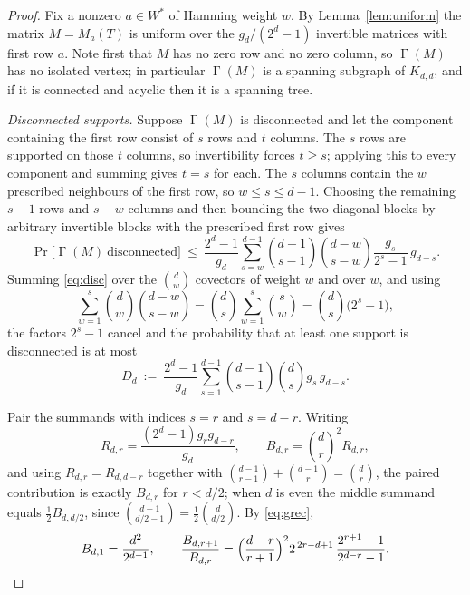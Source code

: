 \documentclass[11pt,reqno]{amsart}
\theoremstyle{plain}
\theoremstyle{definition}
\DeclareMathOperator{\Gam}{\Gamma}
\begin{document}
\begin{proof}
Fix a nonzero $a\in W^{*}$ of Hamming weight $w$. By Lemma~\ref{lem:uniform} the matrix $M=M_{a}(T)$ is uniform over the $g_{d}/(2^{d}-1)$ invertible matrices with first row $a$. Note first that $M$ has no zero row and no zero column, so $\Gam(M)$ has no isolated vertex; in particular $\Gam(M)$ is a spanning subgraph of $K_{d,d}$, and if it is connected and acyclic then it is a spanning tree.

\smallskip
\noindent\emph{Disconnected supports.} Suppose $\Gam(M)$ is disconnected and let the component containing the first row consist of $s$ rows and $t$ columns. The $s$ rows are supported on those $t$ columns, so invertibility forces $t\ge s$; applying this to every component and summing gives $t=s$ for each. The $s$ columns contain the $w$ prescribed neighbours of the first row, so $w\le s\le d-1$. Choosing the remaining $s-1$ rows and $s-w$ columns and then bounding the two diagonal blocks by arbitrary invertible blocks with the prescribed first row gives
\begin{equation}\label{eq:disc}
\Pr\bigl[\Gam(M)\ \text{disconnected}\bigr]\ \le\ \frac{2^{d}-1}{g_{d}}\sum_{s=w}^{d-1}\binom{d-1}{s-1}\binom{d-w}{s-w}\frac{g_{s}}{2^{s}-1}\,g_{d-s}.
\end{equation}
Summing \eqref{eq:disc} over the $\binom{d}{w}$ covectors of weight $w$ and over $w$, and using
\[
\sum_{w=1}^{s}\binom{d}{w}\binom{d-w}{s-w}=\binom{d}{s}\sum_{w=1}^{s}\binom{s}{w}=\binom{d}{s}\bigl(2^{s}-1\bigr),
\]
the factors $2^{s}-1$ cancel and the probability that at least one support is disconnected is at most
\begin{equation}\label{eq:Dd}
D_{d}\ :=\ \frac{2^{d}-1}{g_{d}}\sum_{s=1}^{d-1}\binom{d-1}{s-1}\binom{d}{s}g_{s}\,g_{d-s}.
\end{equation}

Pair the summands with indices $s=r$ and $s=d-r$. Writing
\[
R_{d,r}=\frac{(2^{d}-1)g_{r}g_{d-r}}{g_{d}},\qquad B_{d,r}=\binom{d}{r}^{2}R_{d,r},
\]
and using $R_{d,r}=R_{d,d-r}$ together with $\binom{d-1}{r-1}+\binom{d-1}{r}=\binom{d}{r}$, the paired contribution is exactly $B_{d,r}$ for $r<d/2$; when $d$ is even the middle summand equals $\tfrac12 B_{d,d/2}$, since $\binom{d-1}{d/2-1}=\tfrac12\binom{d}{d/2}$. By \eqref{eq:grec},
\[
B_{d,1}=\frac{d^{2}}{2^{d-1}},\qquad
\frac{B_{d,r+1}}{B_{d,r}}=\Bigl(\frac{d-r}{r+1}\Bigr)^{2}2^{\,2r-d+1}\,\frac{2^{r+1}-1}{2^{d-r}-1}.
\]


\end{proof}
\end{document}
